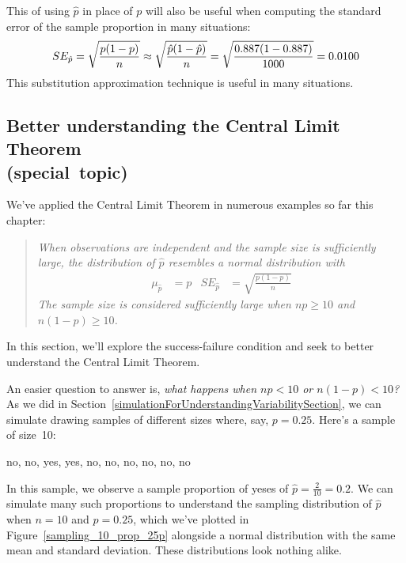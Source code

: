 This  of using $\hat{p}$ in
place of $p$ will also be useful when computing the standard error
of the sample proportion in many situations:
\begin{align*}
SE_{\hat{p}}
    = \sqrt{\frac{p (1 - p)}{n}}
    \approx \sqrt{\frac{\hat{p} (1 - \hat{p})}{n}}
    = \sqrt{\frac{0.887{}
        (1 - 0.887{})}{1000{}}}
    = 0.0100{}
\end{align*}
This substitution approximation technique is useful in many
situations.


\subsection[Better understanding the Central Limit Theorem
    (special~topic)]
  {Better understanding the Central Limit Theorem \\
      \mbox{(special~topic)}}



We've applied the Central Limit Theorem in numerous examples
so far this chapter:
\begin{quote}{\em
When observations are independent and the sample size is
sufficiently large, the distribution of $\hat{p}$ resembles
a normal distribution with
\begin{align*}
  \mu_{\hat{p}} &= p
  &SE_{\hat{p}} &= \sqrt{\frac{p (1 - p)}{n}}
\end{align*}
The sample size is considered sufficiently large
when $n p \geq 10$ and $n (1 - p) \geq 10$.
}\end{quote}
In this section, we'll explore the success-failure
condition and seek to better understand the
Central Limit Theorem.

An easier question to answer is, \emph{what happens when
$np < 10$ or $n(1-p) < 10$?} As we did in
Section~\ref{simulationForUnderstandingVariabilitySection},
we can simulate drawing samples of different sizes where,
say, $p = 0.25$. Here's a sample of
size~10:
\begin{center}
no, no, yes, yes, no, no, no, no, no, no
\end{center}
In this sample, we observe a sample proportion of yeses
of $\hat{p} = \frac{2}{10} = 0.2$. We can simulate many such
proportions to understand the sampling distribution of
$\hat{p}$ when $n = 10$ and $p = 0.25$, which we've plotted
in Figure~\ref{sampling_10_prop_25p}
alongside a normal distribution with the
same mean and standard deviation. These distributions
look nothing alike.

